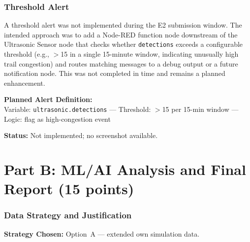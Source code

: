 \documentclass[11pt]{article}
\begin{document}
\section{Threshold Alert}
\label{sec:alert}

A threshold alert was not implemented during the E2 submission window. The intended approach was to add a Node-RED function node downstream of the Ultrasonic Sensor node that checks whether \texttt{detections} exceeds a configurable threshold (e.g., $>$15 in a single 15-minute window, indicating unusually high trail congestion) and routes matching messages to a debug output or a future notification node. This was not completed in time and remains a planned enhancement.

\vspace{0.5em}

\noindent\textbf{Planned Alert Definition:}\\{}
Variable: \texttt{ultrasonic.detections} --- Threshold: $>$15 per 15-min window --- Logic: flag as high-congestion event

\vspace{0.5em}

\noindent\textbf{Status:} Not implemented; no screenshot available.

%
%

\part*{Part B: ML/AI Analysis and Final Report (15 points)}

\section{Data Strategy and Justification}
\label{sec:datastrategy}

\noindent\textbf{Strategy Chosen:} Option~A --- extended own simulation data.
\end{document}

